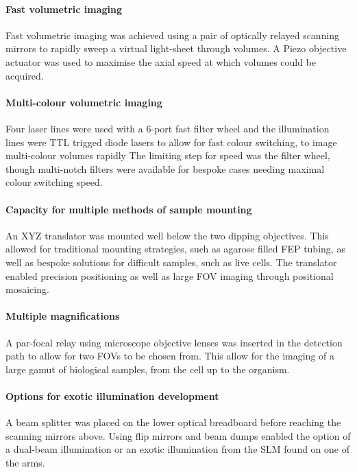 \paragraph{Fast volumetric imaging}
Fast volumetric imaging was achieved using a pair of optically relayed scanning mirrors to rapidly sweep a virtual light-sheet through volumes.
A Piezo objective actuator was used to maximise the axial speed at which volumes could be acquired.

\paragraph{Multi-colour volumetric imaging}
Four laser lines were used with a 6-port fast filter wheel and the illumination lines were TTL trigged diode lasers to allow for fast colour switching, to image multi-colour volumes rapidly
The limiting step for speed was the filter wheel, though multi-notch filters were available for bespoke cases needing maximal colour switching speed.%

\paragraph{Capacity for multiple methods of sample mounting}
An XYZ translator was mounted well below the two dipping objectives.
This allowed for traditional mounting strategies, such as agarose filled FEP tubing, as well as bespoke solutions for difficult samples, such as live cells.
The translator enabled precision positioning as well as large FOV imaging through positional mosaicing.

\paragraph{Multiple magnifications}
A par-focal relay using microscope objective lenses was inserted in the detection path to allow for two FOVs to be chosen from. This allow for the imaging of a large gamut of biological samples, from the cell up to the organism.

\paragraph{Options for exotic illumination development}
A beam splitter was placed on the lower optical breadboard before reaching the scanning mirrors above. Using flip mirrors and beam dumps enabled the option of a dual-beam illumination or an exotic illumination from the SLM found on one of the arms.

